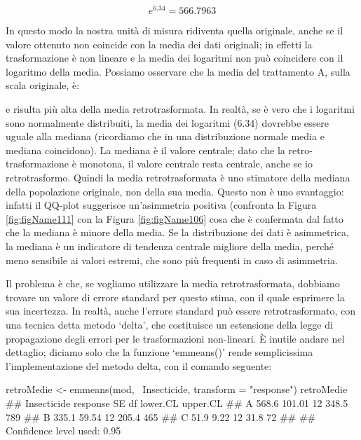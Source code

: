 \documentclass[a4paper,12pt,oneside]{book}
\newenvironment{Shaded}{}{}
\newcommand{\KeywordTok}[1]{#1}
\newcommand{\DataTypeTok}[1]{#1}
\newcommand{\StringTok}[1]{#1}
\newcommand{\CommentTok}[1]{#1}
\newcommand{\OperatorTok}[1]{#1}
\newcommand{\NormalTok}[1]{#1}
\begin{document}
\[e^{6.34} = 566.7963\]

In questo modo la nostra unità di misura ridiventa quella originale, anche se il valore ottenuto non coincide con la media dei dati originali; in effetti la trasformazione è non lineare e la media dei logaritmi non può coincidere con il logaritmo della media. Possiamo osservare che la media del trattamento A, sulla scala originale, è:

\begin{Shaded}
\end{Shaded}

e risulta più alta della media retrotrasformata. In realtà, se è vero che i logaritmi sono normalmente distribuiti, la media dei logaritmi (6.34) dovrebbe essere uguale alla mediana (ricordiamo che in una distribuzione normale media e mediana coincidono). La mediana è il valore centrale; dato che la retro-trasformazione è monotona, il valore centrale resta centrale, anche se io retrotrasformo. Quindi la media retrotrasformata è uno stimatore della mediana della popolazione originale, non della sua media. Questo non è uno svantaggio: infatti il QQ-plot suggerisce un'asimmetria positiva (confronta la Figura \ref{fig:figName111} con la Figura \ref{fig:figName106} cosa che è confermata dal fatto che la mediana è minore della media. Se la distribuzione dei dati è asimmetrica, la mediana è un indicatore di tendenza centrale migliore della media, perché meno sensibile ai valori estremi, che sono più frequenti in caso di asimmetria.

Il problema è che, se vogliamo utilizzare la media retrotrasformata, dobbiamo trovare un valore di errore standard per questo stima, con il quale esprimere la sua incertezza. In realtà, anche l'errore standard può essere retrotrasformato, con una tecnica detta metodo `delta', che costituisce un estensione della legge di propagazione degli errori per le trasformazioni non-lineari. È inutile andare nel dettaglio; diciamo solo che la funzione `emmeans()' rende semplicissima l'implementazione del metodo delta, con il comando seguente:

\begin{Shaded}
\begin{Highlighting}[]
\NormalTok{retroMedie <-}\StringTok{ }\KeywordTok{emmeans}\NormalTok{(mod, }\OperatorTok{~}\NormalTok{Insecticide, }\DataTypeTok{transform =} \StringTok{"response"}\NormalTok{)}
\NormalTok{retroMedie}
\CommentTok{##  Insecticide response     SE df lower.CL upper.CL}
\CommentTok{##  A              568.6 101.01 12    348.5      789}
\CommentTok{##  B              335.1  59.54 12    205.4      465}
\CommentTok{##  C               51.9   9.22 12     31.8       72}
\CommentTok{## }
\CommentTok{## Confidence level used: 0.95}
\end{Highlighting}
\end{Shaded}
\end{document}
